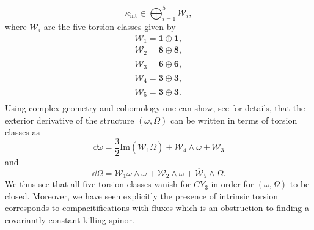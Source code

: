 \begin{equation}
    \kappa_{\text{int}} \in \bigoplus_{i=1}^5 \mathscr{W}_i,
\end{equation}
where $\mathscr{W}_i$ are the five torsion classes given by 
\begin{align*}
    \mathscr{W}_1 = \mathbf{1}\oplus\mathbf{1},\\
    \mathscr{W}_2 = \mathbf{8}\oplus\mathbf{8},\\
    \mathscr{W}_3 = \mathbf{6}\oplus\overbar{\mathbf{6}},\\
    \mathscr{W}_4 = \mathbf{3}\oplus\overbar{\mathbf{3}},\\
    \mathscr{W}_5 = \mathbf{3}\oplus\overbar{\mathbf{3}}.\\
\end{align*}
Using complex geometry and cohomology one can show, see \cite{Blumenhagen2013} for details, that the exterior derivative of the structure $(\omega,\Omega)$ can be written in terms of torsion classes as 
\begin{equation}
    \dd \omega = \frac{3}{2}\text{Im}(\overbar{\mathscr{W}}_1\Omega)+\mathscr{W}_4\wedge \omega+\mathscr{W}_3
\end{equation}
and 
\begin{equation}
    \dd \Omega = \mathscr{W}_1\omega\wedge\omega+\mathscr{W}_2\wedge\omega+\overbar{\mathscr{W}}_5\wedge\Omega.
\end{equation}
We thus see that all five torsion classes vanish for $CY_3$ in order for $(\omega,\Omega)$ to be closed. Moreover, we have seen explicitly the presence of intrinsic torsion corresponds to compacitifications with fluxes which is an obstruction to finding a covariantly constant killing spinor.


